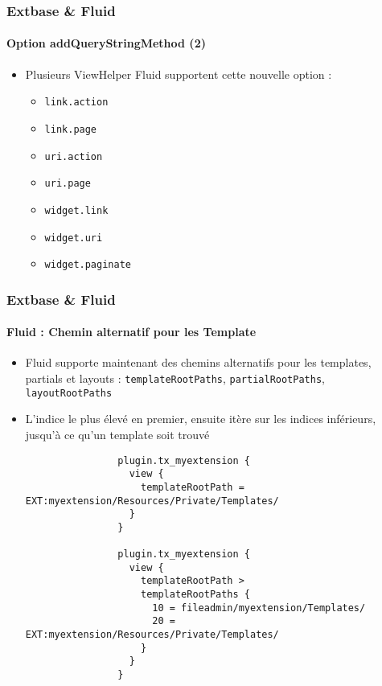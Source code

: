 
\begin{frame}[fragile]
	\frametitle{Extbase \& Fluid}
	\framesubtitle{Option addQueryStringMethod (2)}

	\begin{itemize}
		\item Plusieurs ViewHelper Fluid supportent cette nouvelle option :

			\begin{itemize}\smaller
				\item \texttt{link.action}
				\item \texttt{link.page}
				\item \texttt{uri.action}
				\item \texttt{uri.page}
				\item \texttt{widget.link}
				\item \texttt{widget.uri}
				\item \texttt{widget.paginate}
			\end{itemize}

	\end{itemize}

\end{frame}


\begin{frame}[fragile]
	\frametitle{Extbase \& Fluid}
	\framesubtitle{Fluid : Chemin alternatif pour les Template}

	\lstset{
		basicstyle=\tiny\ttfamily
	}

	\begin{itemize}
		\item Fluid supporte maintenant des chemins alternatifs pour les templates, partials et layouts :\newline
			\smaller\texttt{templateRootPaths}, \texttt{partialRootPaths}, \texttt{layoutRootPaths}\normalsize
		\item L'indice le plus élevé en premier, ensuite itère sur les indices inférieurs, jusqu'à ce qu'un template soit trouvé

			\begin{lstlisting}
				plugin.tx_myextension {
				  view {
				    templateRootPath = EXT:myextension/Resources/Private/Templates/
				  }
				}

				plugin.tx_myextension {
				  view {
				    templateRootPath >
				    templateRootPaths {
				      10 = fileadmin/myextension/Templates/
				      20 = EXT:myextension/Resources/Private/Templates/
				    }
				  }
				}
			\end{lstlisting}

	\end{itemize}

\end{frame}


